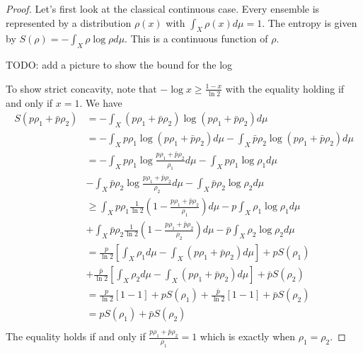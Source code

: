 \begin{proof}
	Let's first look at the classical continuous case. Every ensemble is represented by a distribution $\rho(x)$ with $\int_X \rho(x) d\mu=1$. The entropy is given by $S(\rho) = - \int_X \rho \log \rho d\mu$. This is a continuous function of $\rho$.
	
	TODO: add a picture to show the bound for the log
	
	To show strict concavity, note that $- \log x \geq \frac{1-x}{\ln 2}$ with the equality holding if and only if $x=1$. We have
	\begin{equation}
		\begin{aligned}
			S(p\rho_1 + \bar{p}\rho_2) &= - \int_X \left(p\rho_1 + \bar{p}\rho_2\right) \log \left(p\rho_1 + \bar{p}\rho_2\right) d\mu \\
			&= - \int_X p\rho_1 \log \left(p\rho_1 + \bar{p}\rho_2\right) d\mu - \int_X \bar{p}\rho_2 \log \left(p\rho_1 + \bar{p}\rho_2\right) d\mu \\
			&= - \int_X p\rho_1 \log \frac{p\rho_1 + \bar{p}\rho_2}{\rho_1} d\mu - \int_X p\rho_1 \log \rho_1 d\mu \\
			&- \int_X \bar{p}\rho_2 \log \frac{p\rho_1 + \bar{p}\rho_2}{\rho_2} d\mu - \int_X \bar{p}\rho_2 \log \rho_2 d\mu \\
			&\geq \int_X p\rho_1 \frac{1}{\ln 2} \left(1 - \frac{p\rho_1 + \bar{p}\rho_2}{\rho_1} \right)   d\mu - p \int_X \rho_1 \log \rho_1 d\mu \\
			&+ \int_X \bar{p}\rho_2 \frac{1}{\ln 2} \left(1 - \frac{p\rho_1 + \bar{p}\rho_2}{\rho_2} \right)   d\mu - \bar{p} \int_X \rho_2 \log \rho_2 d\mu \\
			&= \frac{p}{\ln 2}\left[ \int_X \rho_1 d\mu - \int_X \left(p\rho_1 + \bar{p}\rho_2\right) d\mu  \right] + p S(\rho_1) \\
			&+ \frac{\bar{p}}{\ln 2}\left[ \int_X \rho_2 d\mu - \int_X \left(p\rho_1 + \bar{p}\rho_2\right) d\mu  \right] + \bar{p} S(\rho_2) \\
			&= \frac{p}{\ln 2}\left[ 1 - 1  \right] + p S(\rho_1) + \frac{\bar{p}}{\ln 2}\left[ 1 - 1 \right] + \bar{p} S(\rho_2) \\
			&= p S(\rho_1) + \bar{p} S(\rho_2) \\
		\end{aligned}
	\end{equation}
	The equality holds if and only if $\frac{p\rho_1 + \bar{p}\rho_2}{\rho_1} = 1$ which is exactly when $\rho_1 = \rho_2$.
		

\end{proof}

